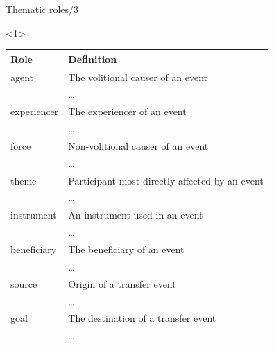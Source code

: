 \documentclass[10pt, compress]{beamer}
\begin{document}
\begin{frame}{Thematic roles/3}

\begin{onlyenv}<1>
\begin{center}
\begin{small}
\begin{tabular}{ll}
  \textbf{Role} & \textbf{Definition} \\
 \hline
  {\sc agent}  & The volitional causer of an event \\
               & \ldots \\
  {\sc experiencer} & The experiencer of an event  \\
                    & \ldots \\
  {\sc force} & Non-volitional causer of an event  \\
              & \ldots \\
  {\sc theme} & Participant most directly affected by an event  \\
              & \ldots \\
  {\sc instrument} & An instrument used in an event \\
                 & \ldots \\
  {\sc beneficiary} & The beneficiary of an event \\
                 & \ldots \\
  {\sc source} & Origin of a transfer event \\
              & \ldots \\
  {\sc goal} & The destination of a transfer event \\
               & \ldots \\
 \hline
\end{tabular} 
\end{small}
\end{center}
\end{onlyenv}



\end{frame}
\end{document}
